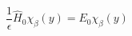 \begin{equation}
\frac{1}{\epsilon}\hat{H}_0\chi_{\beta}(y) = E_0\chi_{\beta}(y)
\label{2.19b}
\end{equation}

